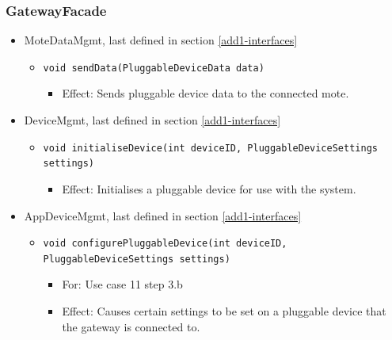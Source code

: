     \subsubsection{GatewayFacade}
        \begin{itemize}
            \item MoteDataMgmt, last defined in section \ref{add1-interfaces}
            \begin{itemize}
                \item \texttt{void sendData(PluggableDeviceData data)}
                \begin{itemize}
                    \item Effect: Sends pluggable device data to the connected mote.
                \end{itemize}
            \end{itemize}

            \item DeviceMgmt, last defined in section \ref{add1-interfaces}
            \begin{itemize}
                \item \texttt{void initialiseDevice(int deviceID, PluggableDeviceSettings settings)}
                \begin{itemize}
                    \item Effect: Initialises a pluggable device for use with the system.
                \end{itemize}
            \end{itemize}

            \item AppDeviceMgmt, last defined in section \ref{add1-interfaces}
            \begin{itemize}
                \item \texttt{void configurePluggableDevice(int deviceID, PluggableDeviceSettings settings)}
                \begin{itemize}
                    \item For: Use case 11 step 3.b
                    \item Effect: Causes certain settings to be set on a pluggable
                          device that the gateway is connected to.
                \end{itemize}
            \end{itemize}
        \end{itemize}

